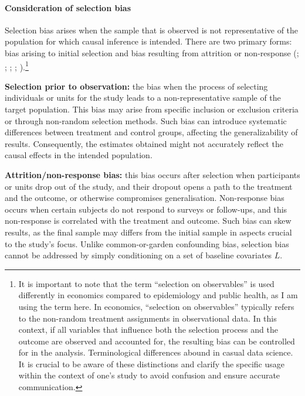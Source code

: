 \documentclass[
  singlecolumn,
  9pt]{article}
\let\oldparagraph\paragraph
\renewcommand{\paragraph}[1]{\oldparagraph{#1}\mbox{}}
\begin{document}
\paragraph{Consideration of selection
bias}\label{consideration-of-selection-bias}

Selection bias arises when the sample that is observed is not
representative of the population for which causal inference is intended.
There are two primary forms: bias arising to initial selection and bias
resulting from attrition or non-response
(;
;
; ; ).\footnote{It is important to note that the term ``selection on
  observables'' is used differently in economics compared to
  epidemiology and public health, as I am using the term here. In
  economics, ``selection on observables'' typically refers to the
  non-random treatment assignments in observational data. In this
  context, if all variables that influence both the selection process
  and the outcome are observed and accounted for, the resulting bias can
  be controlled for in the analysis. Terminological differences abound
  in casual data science. It is crucial to be aware of these
  distinctions and clarify the specific usage within the context of
  one's study to avoid confusion and ensure accurate communication.}

\textbf{Selection prior to observation:} the bias when the process of
selecting individuals or units for the study leads to a
non-representative sample of the target population. This bias may arise
from specific inclusion or exclusion criteria or through non-random
selection methods. Such bias can introduce systematic differences
between treatment and control groups, affecting the generalizability of
results. Consequently, the estimates obtained might not accurately
reflect the causal effects in the intended population.

\textbf{Attrition/non-response bias:} this bias occurs after selection
when participants or units drop out of the study, and their dropout
opens a path to the treatment and the outcome, or otherwise compromises
generalisation. Non-response bias occurs when certain subjects do not
respond to surveys or follow-ups, and this non-response is correlated
with the treatment and outcome. Such bias can skew results, as the final
sample may differs from the initial sample in aspects crucial to the
study's focus. Unlike common-or-garden confounding bias, selection bias
cannot be addressed by simply conditioning on a set of baseline
covariates \(L\).
\end{document}
